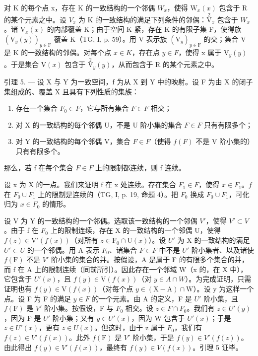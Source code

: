 对 K 的每个点 x，存在 K 的一致结构的一个邻偶 \(W_{x}\)，使得 \(\mathrm{W}_{x}(x)\) 包含于 R 的某个元素之中。设 \(V_{x}\) 为 K 的一致结构的满足下列条件的邻偶：\(\overset{2}{\mathrm{V}}_{x}\) 包含于 \(W_{x}\)。诸 \(\mathrm{V}_{x}(x)\) 的内部覆盖 K；由于空间 K 紧，存在 K 的有限子集 F，使得族 \((\mathrm{V}_{y}(y))_{y\in\mathrm{F}}\) 覆盖 K（TG, I, p. 59）。用 V 表示族 \((\mathrm{V}_{y})_{y\in\mathrm{F}}\) 的交；集合 V 是 K 的一致结构的邻偶。对每个点 \(x\in K\)，存在点 \(y\in F\)，使得 x 属于 \(\mathrm{V}_{y}(y)\)。于是集合 \(\mathrm{V}(x)\) 包含于 \(\overset{2}{\mathrm{V}}_{y}(y)\)，从而包含于 R 的某个元素之中。

引理 5. --- 设 X 与 Y 为一致空间，f 为从 X 到 Y 中的映射。设 F 为由 X 的闭子集组成的、覆盖 X 且具有下列性质的集族：

\begin{enumerate}
\def\labelenumi{(\roman{enumi})}
\item
  存在一个集合 \(F_{0} \in F\)，它与所有集合 \(F \in F\) 相交；
\item
  对 X 的一致结构的每个邻偶 U，不是 U 阶小集的集合 \(F \in F\) 只有有限多个；
\item
  对 Y 的一致结构的每个邻偶 V，集合 \(F \in F\)（使得 \(f(F)\) 不是 V 阶小集的）只有有限多个。
\end{enumerate}

那么，若 f 在每个集合 \(F \in F\) 上的限制都连续，则 f 连续。

设 x 为 X 的一点。我们来证明 f 在 x 处连续。存在集合 \(F_{1} \in F\)，使得 \(x \in F_{1}\)。\(f\) 在 \(F_{0} \cup F_{1}\) 上的限制是连续的（TG, I, p. 19, 命题 4）。把 \(F_{0}\) 换成 \(F_{0} \cup F_{1}\)，可化归为 \(x \in F_{0}\) 的情形。

设 V 为 Y 的一致结构的一个邻偶。选取该一致结构的一个邻偶 \(V'\)，使得 \(V' \subset V\)。由于 f 在 \(F_0\) 上的限制连续，存在 X 的一致结构的一个邻偶 U，使得 \(f(z) \in \mathrm{V}'(f(x))\)（对所有 \(z \in \mathrm{F}_0 \cap \mathrm{U}(x)\)）。设 \(U'\) 为 X 的一致结构的满足 \(U' \subset U\) 的一个邻偶。用 A 表示 \(F_0\)、诸集合 \(F \in F\) 中不是 \(U'\) 阶小集者、以及诸使 \(f(\mathrm{F})\) 不是 \(V'\) 阶小集的集合的并。按假设，A 是属于 F 的有限多个集合的并，而 f 在 A 上的限制连续（同前所引）。因此存在一个邻域 W（x 的，在 X 中），它包含于 \(U'(x)\)，且 \(f(y) \in \mathrm{V}(f(x))\)（对 \(y \in A \cap W\)）。为完成证明，只需证明也有 \(f(y) \in \mathrm{V}(f(x))\)（对每个点 \(y \in (\mathrm{X} - \mathrm{A}) \cap \mathrm{W}\)）。设 y 为这样一个点。设 F 为 F 的满足 \(y \in F\) 的一个元素。由 A 的定义，F 是 \(U'\) 阶小集，且 \(f(\mathrm{F})\) 是 \(V'\) 阶小集。按假设，F 与 \(F_0\) 相交。设 \(z \in F \cap F_0\)。我们有 \(z \in U'(y)\)，因为 F 是 \(U'\) 阶小集；又有 \(y \in U'(x)\)，因为 W 包含于 \(U'(x)\)；于是 \(z \in U'(x)\)，更有 \(z \in U(x)\)。但这时，由于 z 属于 \(F_0\)，我们有 \(f(z) \in V'(f(x))\)。此外 \(f(\mathrm{F})\) 是 \(V'\) 阶小集，于是 \(f(y) \in V'(f(z))\)。由此得出 \(f(y) \in V'(f(x))\)，最终有 \(f(y) \in V(f(x))\)。引理 5 证毕。

